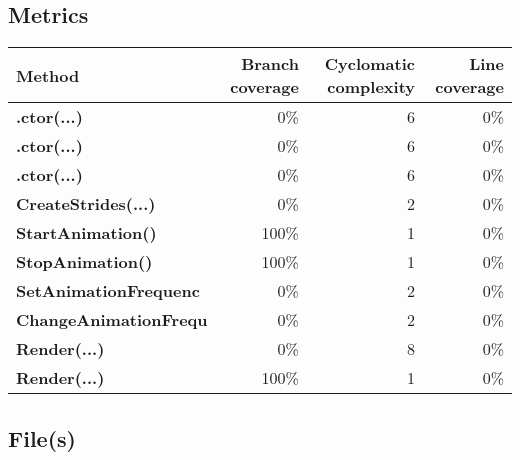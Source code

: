\documentclass[a4paper,landscape,10pt]{article}
\begin{document}
\subsection{Metrics}
\begin{longtable}[l]{|l|r|r|r|}
\hline
\textbf{Method} & \textbf{Branch coverage} & \textbf{Cyclomatic complexity} & \textbf{Line coverage}\\
\hline
\textbf{.ctor(...)} & 0\% & 6 & 0\%\\
\hline
\textbf{.ctor(...)} & 0\% & 6 & 0\%\\
\hline
\textbf{.ctor(...)} & 0\% & 6 & 0\%\\
\hline
\textbf{CreateStrides(...)} & 0\% & 2 & 0\%\\
\hline
\textbf{StartAnimation()} & 100\% & 1 & 0\%\\
\hline
\textbf{StopAnimation()} & 100\% & 1 & 0\%\\
\hline
\textbf{SetAnimationFrequenc} & 0\% & 2 & 0\%\\
\hline
\textbf{ChangeAnimationFrequ} & 0\% & 2 & 0\%\\
\hline
\textbf{Render(...)} & 0\% & 8 & 0\%\\
\hline
\textbf{Render(...)} & 100\% & 1 & 0\%\\
\hline
\end{longtable}
\subsection{File(s)}
\end{document}

